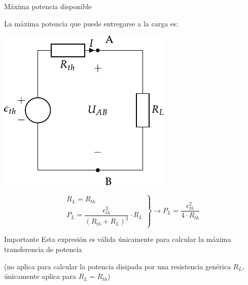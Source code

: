\documentclass[aspectratio=169, xcolor={usenames,svgnames,dvipsnames}]{beamer}
\begin{document}
\begin{frame}{Máxima potencia disponible}

\vspace{3mm}
La \alert{máxima potencia} que puede entregarse a la carga es:

    \vspace{3mm}
    \begin{minipage}[c]{0.4\linewidth}
        \includegraphics[height=0.62\textheight]{../figs/thevenin_continua.pdf}
    \end{minipage}
    \hfill
    \begin{minipage}[c]{0.58\linewidth}
        \begin{equation*}
          \left.
            \begin{matrix}
              R_L = R_{th}\\[5pt]
              P_L = \dfrac{\epsilon^2_{th}}{(R_{th} + R_L)^2} \cdot R_L
            \end{matrix} \right\}\rightarrow
          \boxed{P_L = \frac{\epsilon^2_{th}}{4 \cdot R_{th}}}
        \end{equation*}
    
        \begin{block}{Importante}
            Esta expresión es \alert{válida únicamente} para calcular la \alert{máxima transferencia} de potencia
        \end{block}
        \centering \small{(no aplica para calcular la potencia disipada por una resistencia genérica $R_L$, únicamente aplica para $R_L = R_{th}$)}
    \end{minipage}
\end{frame}

\end{document}
